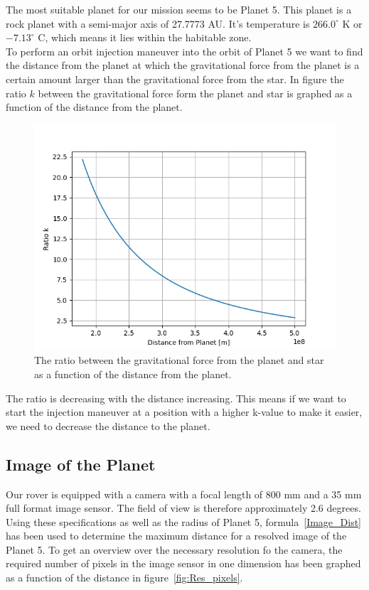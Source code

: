 \documentclass[reprint,english,notitlepage]{revtex4-2}
\begin{document}
	The most suitable planet for our mission seems to be Planet 5.
	This planet is a rock planet with a semi-major axis of 27.7773 AU.
	It's temperature is $266.0^{\circ}$ K or $-7.13^{\circ}$ C, which means it lies within the habitable zone.\\

	To perform an orbit injection maneuver into the orbit of Planet 5 we want to find the distance from the planet at which the gravitational force from the planet is a certain amount larger than the gravitational force from the star.
	In figure the ratio $k$ between the gravitational force form the planet and star is graphed as a function of the distance from the planet.

	\begin{figure}[h]
		\centering
		\includegraphics[scale=0.4]{Figures/Grav_ratio_k}
		\caption{The ratio between the gravitational force from the planet and star as a function of the distance from the planet.}\label{fig:k_ratio_dist}
	\end{figure}

	The ratio is decreasing with the distance increasing.
	This means if we want to start the injection maneuver at a position with a higher k-value to make it easier, we need to decrease the distance to the planet.


\subsection{Image of the Planet}\label{subsec:image-of-the-planet}
	Our rover is equipped with a camera with a focal length of 800 mm and a 35 mm full format image sensor.
	The field of view is therefore approximately 2.6 degrees.
	Using these specifications as well as the radius of Planet 5, formula~\eqref{Image_Dist} has been used to determine the maximum distance for a resolved image of the Planet 5.
	To get an overview over the necessary resolution fo the camera, the required number of pixels in the image sensor in one dimension has been graphed as a function of the distance in figure~\ref{fig:Res_pixels}.
\end{document}
